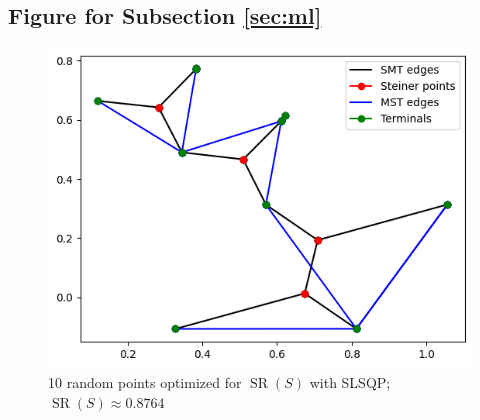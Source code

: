 \documentclass{mpaper}
\begin{document}
\subsection{Figure for Subsection \ref{sec:ml}}
\begin{figure}[h!]
  \begin{center}
  \includegraphics[scale=0.5]{plot8764.png}
  \end{center}
  \caption{\label{fig:9}10 random points optimized for $\operatorname{SR}(S)$ with SLSQP; $\operatorname{SR}(S)\approx 0.8764$}
\end{figure}


\end{document}
